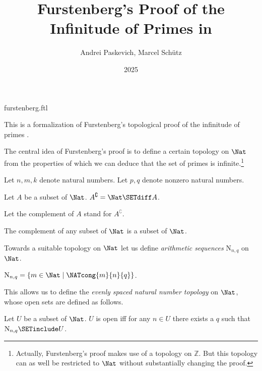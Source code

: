 \documentclass{stex}
\title{Furstenberg's Proof of the Infinitude of Primes in \Naproche}
\author{Andrei Paskevich, Marcel Schütz}
\date{2025}
\newcommand{\N}{\mathrm{N}}
\newcommand{\Int}{\mathbb{Z}}
\begin{document}
\begin{smodule}{furstenberg.ftl}
\maketitle


\noindent This is a formalization of Furstenberg's topological proof of the
infinitude of primes \cite[p. 353]{Furstenberg1955}.

The central idea of Furstenberg's proof is to define a certain topology on
$\Nat$ from the properties of which we can deduce that the set of
primes is infinite.\footnote{Actually, Furstenberg's proof makes use of a
topology on $\Int$. But this topology can as well be restricted to
$\Nat$ without substantially changing the proof.}

\begin{forthel}
  Let $n, m, k$ denote natural numbers.
  Let $p, q$ denote nonzero natural numbers.

  \begin{definition}
    Let $A$ be a subset of $\Nat$.
    $A^\complement = \Nat \SETdiff A$.
  \end{definition}

  Let the complement of $A$ stand for $A^\complement$.

  \begin{lemma}
    The complement of any subset of $\Nat$ is a subset of $\Nat$.
  \end{lemma}
\end{forthel}

Towards a suitable topology on $\Nat$ let us define \textit{arithmetic
sequences} $\N_{n, q}$ on $\Nat$.

\begin{forthel}
  \begin{definition}
    $\N_{n, q} = \{ m \in \Nat \mid \NATcong{m}{n}{q} \}$.
  \end{definition}
\end{forthel}

This allows us to define the \textit{evenly spaced natural number
topology} on $\Nat$, whose open sets are defined as follows.

\begin{forthel}
  \begin{definition}
    Let $U$ be a subset of $\Nat$.
    $U$ is open iff for any $n \in U$ there exists a $q$ such that
    $\N_{n, q} \SETinclude U$.
  \end{definition}


\end{forthel}
\end{smodule}
\end{document}

